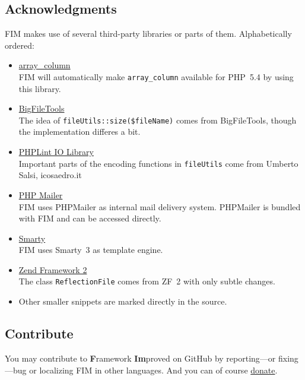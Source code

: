 \documentclass{scrartcl}
\newcommand{\fim}{\textbf{F}ramework \textbf{Im}proved}
\begin{document}
   \subsection{Acknowledgments}
      FIM makes use of several third-party libraries or parts of them. Alphabetically ordered:
      \begin{itemize}
         \item \href{https://github.com/ramsey/array_column}{\color{blue}array\_column} \\
         FIM will automatically make \lstinline!array_column! available for PHP~5.4 by using this library.
         \item \href{https://github.com/jkuchar/BigFileTools/blob/master/class/BigFileTools.php}{\color{blue}BigFileTools} \\
            The idea of \lstinline!fileUtils::size($fileName)! comes from BigFileTools, though the implementation differes a bit.
         \item \href{http://www.icosaedro.it/phplint/phplint2/libraries.htm}{\color{blue}PHPLint IO Library} \\
            Important parts of the encoding functions in \lstinline!fileUtils! come from Umberto Salsi, icosaedro.it
         \item \href{https://github.com/PHPMailer/PHPMailer/}{\color{blue}PHP Mailer} \\
         FIM uses PHPMailer as internal mail delivery system. PHPMailer is bundled with FIM and can be accessed directly.
         \item \href{http://www.smarty.net/}{\color{blue}Smarty} \\
            FIM uses Smarty~3 as template engine.
         \item \href{http://framework.zend.com/}{\color{blue}Zend Framework 2} \\
            The class \lstinline!ReflectionFile! comes from ZF~2 with only subtle changes.
         \item Other smaller snippets are marked directly in the source.
      \end{itemize}
   \subsection{Contribute}
      You may contribute to \fim{} on GitHub by reporting---or fixing---bug or localizing FIM in other languages. And you can of course \href{https://www.paypal.com/cgi-bin/webscr?cmd=_s-xclick&hosted_button_id=J8369698KPE2W}{\color{blue}donate}.
\end{document}
